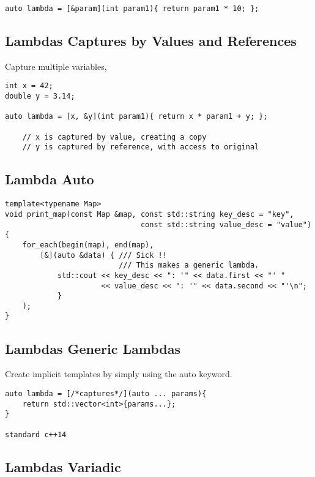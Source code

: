 \begin{verbatim}
auto lambda = [&param](int param1){ return param1 * 10; };
\end{verbatim}

\subsection{Lambdas Captures by Values and References}

Capture multiple variables, 

\begin{verbatim}
int x = 42;
double y = 3.14;

auto lambda = [x, &y](int param1){ return x * param1 + y; };

    // x is captured by value, creating a copy
    // y is captured by reference, with access to original
\end{verbatim}

\subsection{Lambda Auto}
\begin{verbatim}
template<typename Map>
void print_map(const Map &map, const std::string key_desc = "key",
                               const std::string value_desc = "value")
{
    for_each(begin(map), end(map),
        [&](auto &data) { /// Sick !!
                          /// This makes a generic lambda.
            std::cout << key_desc << ": '" << data.first << "' "
                      << value_desc << ": '" << data.second << "'\n";
            }
    );
}
\end{verbatim}

\subsection{Lambdas Generic Lambdas}

Create implicit templates by simply using the auto keyword.

\begin{verbatim}
auto lambda = [/*captures*/](auto ... params){
    return std::vector<int>{params...};
}

standard c++14
\end{verbatim}

\subsection{Lambdas Variadic}

